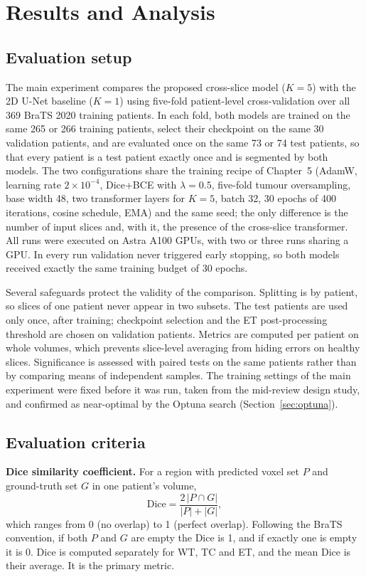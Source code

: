 \clearpage
\chapter{Results and Analysis}
\section{Evaluation setup}
The main experiment compares the proposed cross-slice model ($K=5$) with the 2D U-Net baseline ($K=1$) using five-fold patient-level cross-validation over all 369 BraTS 2020 training patients. In each fold, both models are trained on the same 265 or 266 training patients, select their checkpoint on the same 30 validation patients, and are evaluated once on the same 73 or 74 test patients, so that every patient is a test patient exactly once and is segmented by both models. The two configurations share the training recipe of Chapter~5 (AdamW, learning rate $2 \times 10^{-4}$, Dice+BCE with $\lambda = 0.5$, five-fold tumour oversampling, base width 48, two transformer layers for $K=5$, batch 32, 30 epochs of 400 iterations, cosine schedule, EMA) and the same seed; the only difference is the number of input slices and, with it, the presence of the cross-slice transformer. All runs were executed on Astra A100 GPUs, with two or three runs sharing a GPU. In every run validation never triggered early stopping, so both models received exactly the same training budget of 30 epochs.

Several safeguards protect the validity of the comparison. Splitting is by patient, so slices of one patient never appear in two subsets. The test patients are used only once, after training; checkpoint selection and the ET post-processing threshold are chosen on validation patients. Metrics are computed per patient on whole volumes, which prevents slice-level averaging from hiding errors on healthy slices. Significance is assessed with paired tests on the same patients rather than by comparing means of independent samples. The training settings of the main experiment were fixed before it was run, taken from the mid-review design study, and confirmed as near-optimal by the Optuna search (Section~\ref{sec:optuna}).

\section{Evaluation criteria}
\textbf{Dice similarity coefficient.} For a region with predicted voxel set $P$ and ground-truth set $G$ in one patient's volume,
\begin{equation}
\mathrm{Dice} = \frac{2\,|P \cap G|}{|P| + |G|},
\end{equation}
which ranges from 0 (no overlap) to 1 (perfect overlap). Following the BraTS convention, if both $P$ and $G$ are empty the Dice is 1, and if exactly one is empty it is 0. Dice is computed separately for WT, TC and ET, and the mean Dice is their average. It is the primary metric.


